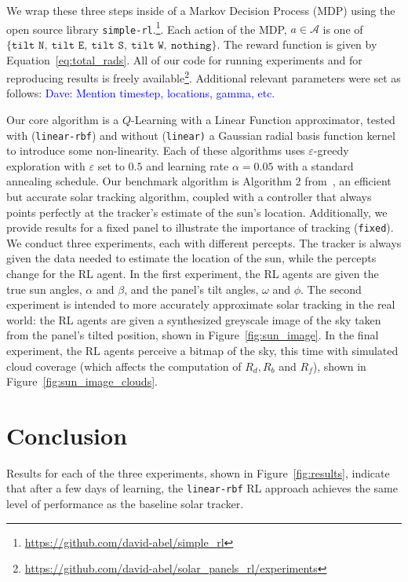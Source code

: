 \documentclass[11pt]{article}
\newcommand{\dnote}[1]{\textcolor{blue}{Dave: #1}}
\newcommand{\mc}{\mathcal}
\begin{document}
We wrap these three steps inside of a Markov Decision Process (MDP) using the open source library \texttt{simple-rl}.\footnote{\url{https://github.com/david-abel/simple_rl}}. Each action of the MDP, $a \in \mc{A}$ is one of $\{\texttt{tilt N},\ \texttt{tilt E},\ \texttt{tilt S},\ \texttt{tilt W},\ \texttt{nothing}\}$. The reward function is given by Equation~\ref{eq:total_rads}. All of our code for running experiments and for reproducing results is freely available\footnote{\url{https://github.com/david-abel/solar_panels_rl/experiments}}. Additional relevant parameters were set as follows: \dnote{Mention timestep, locations, gamma, etc.} %

Our core algorithm is a $Q$-Learning with a Linear Function approximator, tested with (\texttt{linear-rbf}) and without (\texttt{linear)} a Gaussian radial basis function kernel to introduce some non-linearity. Each of these algorithms uses $\varepsilon$-greedy exploration with $\varepsilon$ set to $0.5$ and learning rate $\alpha = 0.05$ with a standard annealing schedule. Our benchmark algorithm is Algorithm 2 from~\citet{Grena2012}, an efficient but accurate solar tracking algorithm, coupled with a controller that always points perfectly at the tracker's estimate of the sun's location. Additionally, we provide results for a fixed panel to illustrate the importance of tracking (\texttt{fixed}). We conduct three experiments, each with different percepts. The tracker is always given the data needed to estimate the location of the sun, while the percepts change for the RL agent. In the first experiment, the RL agents are given the true sun angles, $\alpha$ and $\beta$, and the panel's tilt angles, $\omega$ and $\phi$. The second experiment is intended to more accurately approximate solar tracking in the real world: the RL agents are given a synthesized greyscale image of the sky taken from the panel's tilted position, shown in Figure~\ref{fig:sun_image}. In the final experiment, the RL agents perceive a bitmap of the sky, this time with simulated cloud coverage (which affects the computation of $R_d, R_b$ and $R_f$), shown in Figure~\ref{fig:sun_image_clouds}.

\section{Conclusion}
Results for each of the three experiments, shown in Figure~\ref{fig:results}, indicate that after a few days of learning, the \texttt{linear-rbf} RL approach achieves the same level of performance as the baseline solar tracker.
\end{document}
